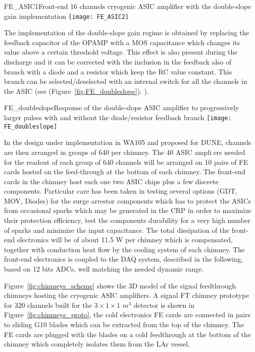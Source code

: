 \begin{cdrfigure}{FE_ASIC1}{Front-end 16 channels cryogenic ASIC amplifier with the double-slope gain implementation}
\texttt{[image: FE\_ASIC2]}
\end{cdrfigure}


The implementation of the double-slope gain regime is obtained by replacing the feedback capacitor of the OPAMP with a MOS capacitance which changes its value above a certain threshold voltage. This effect is also present during the discharge and it can be corrected with the inclusion in the feedback also of branch with a diode and a resistor which keep the RC value constant. This branch  can be selected/deselected with an internal switch for all the channels in the ASIC (see  (Figure~\ref{fig:FE_doubleslope}). ).


\begin{cdrfigure}{FE_doubleslope}{Response of the double-slope ASIC amplifier to progressively larger pulses with and without the diode/resistor feedback branch}
\texttt{[image: FE\_doubleslope]}
\end{cdrfigure}

In the design under implementation in WA105 and proposed for DUNE, channels are then arranged in groups of 640 per chimney. The 40 ASIC ampliers needed for the readout of each group of 640 channels will be arranged on 10 pairs of FE cards hosted on the feed-through at the bottom of each chimney. 
The front-end cards in the chimney host each one two ASIC chips plus a few discrete components. Particular care has been taken in testing several options (GDT, MOV, Diodes) for the surge arrestor components which has to protect the ASICs from occasional sparks which may be generated in the CRP in order to maximize their protection efficiency, test the components durability for a very high number of sparks and minimize the input capacitance.
The total dissipation of the front-end electronics will be of about 11.5 W per chimney which is compensated, together with conduction heat flow by the cooling system of each chimney.  The front-end electronics is coupled to the DAQ system, described in the following, based on 12 bits ADCs, well matching
the needed dynamic range.

Figure~\ref{fig:chimneys_scheme} shows the 3D model of the signal feedthrough chimneys hosting the cryogenic ASIC amplifiers. A signal FT chimney prototype for 320 channels built for the $3\times1\times 1$ $m^3$ detector is shown in Figure~\ref{fig:chimneys_proto}, the cold electronics FE cards are connected in pairs to sliding G10 blades which can be extracted from the top of the chimney. The FE cards are plugged with the blades on a cold feedthrough at the bottom of the chimney which completely isolates them from the LAr vessel.   

